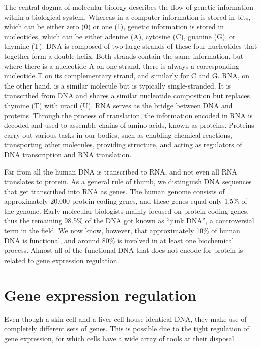 The central dogma of molecular biology describes the flow of genetic information within a biological system. Whereas in a computer information is stored in bits, which can be either zero (0) or one (1), genetic information is stored in nucleotides, which can be either adenine (A), cytosine (C), guanine (G), or thymine (T). DNA is composed of two large strands of these four nucleotides that together form a double helix. Both strands contain the same information, but where there is a nucleotide A on one strand, there is always a corresponding nucleotide T on its complementary strand, and similarly for C and G. RNA, on the other hand, is a similar molecule but is typically single-stranded. It is transcribed from DNA and shares a similar nucleotide composition but replaces thymine (T) with uracil (U). RNA serves as the bridge between DNA and proteins. Through the process of translation, the information encoded in RNA is decoded and used to assemble chains of amino acids, known as proteins. Proteins carry out various tasks in our bodies, such as enabling chemical reactions, transporting other molecules, providing structure, and acting as regulators of DNA transcription and RNA translation.

Far from all the human DNA is transcribed to RNA, and not even all RNA translates to protein. As a general rule of thumb, we distinguish DNA sequences that get transcribed into RNA as genes. The human genome consists of approximately 20.000 protein-coding genes, and these genes equal only 1,5\% of the genome\cite{Piovesan2019}. Early molecular biologists mainly focused on protein-coding genes, thus the remaining 98.5\% of the DNA got known as ``junk DNA'', a controversial term in the field\cite{Graur2013}. We now know, however, that approximately 10\% of human DNA is functional\cite{Graur2013}, and around 80\% is involved in at least one biochemical process\cite{encode2012}. Almost all of the functional DNA that does not encode for protein is related to gene expression regulation.

\section{Gene expression regulation}

Even though a skin cell and a liver cell house identical DNA, they make use of completely different sets of genes. This is possible due to the tight regulation of gene expression, for which cells have a wide array of tools at their disposal. 

